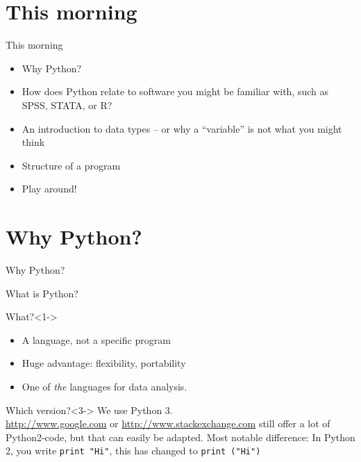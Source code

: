 \documentclass{beamer}
\begin{document}
%
%
%

\section{This morning}
\begin{frame}{This morning}
	\begin{itemize}
		\item Why Python?
		\item How does Python relate to software you might be familiar with, such as SPSS, STATA, or R?
	\item An introduction to data types – or why a “variable” is not what you might think
	\item Structure of a program
	\item Play around!
	\end{itemize}
	
\end{frame}





\section{Why Python?}
\begin{frame}[plain]
	Why Python?
\end{frame}


\begin{frame}{What is Python?}
	\begin{block}{What?}<1->
		\begin{itemize}
			\item A language, not a specific program
			\item Huge advantage: flexibility, portability
			\item One of \emph{the} languages for data analysis. %
		\end{itemize}
	\end{block}
	
	\begin{block}{Which version?}<3->
		We use Python 3. \\ 
		\footnotesize{\url{http://www.google.com} or \url{http://www.stackexchange.com} still offer a lot of Python2-code, but that can easily be adapted. Most notable difference: In Python 2, you write {\tt print "Hi"}, this has changed to {\tt print ("Hi")}}\\
	\end{block}
\end{frame}
\end{document}
